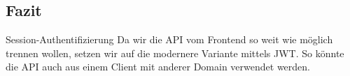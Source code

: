 \subsection{Fazit}
\begin{decision}{Session-Authentifizierung}
Da wir die API vom Frontend so weit wie möglich trennen wollen, setzen wir auf die modernere Variante mittels \acs{JWT}. So könnte die API auch aus einem Client mit anderer Domain verwendet werden.
\end{decision}
